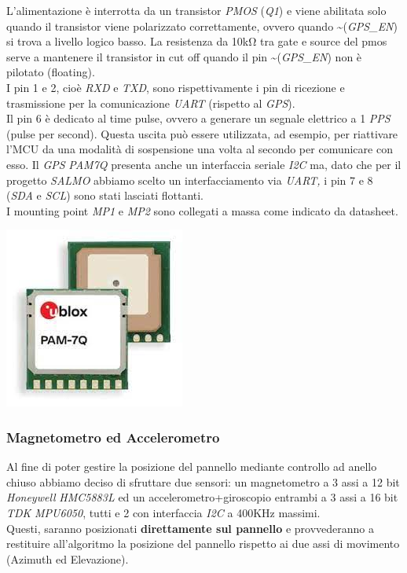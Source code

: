 L'alimentazione è interrotta da un transistor \emph{PMOS} (\emph{Q1}) e
viene abilitata solo quando il transistor viene polarizzato
correttamente, ovvero quando \textasciitilde(\emph{GPS\_EN}) si trova a
livello logico basso. La resistenza da 10kΩ tra gate e source del pmos
serve a mantenere il transistor in cut off quando il pin
\textasciitilde(\emph{GPS\_EN}) non è pilotato (floating).\\
I pin 1 e 2, cioè \emph{RXD} e \emph{TXD}, sono rispettivamente i pin di
ricezione e trasmissione per la comunicazione \emph{UART} (rispetto al
\emph{GPS}).\\
Il pin 6 è dedicato al time pulse, ovvero a generare un segnale
elettrico a 1 \emph{PPS} (pulse per second). Questa uscita può essere
utilizzata, ad esempio, per riattivare l'MCU da una modalità di
sospensione una volta al secondo per comunicare con esso. Il \emph{GPS}
\emph{PAM7Q} presenta anche un interfaccia seriale \emph{I2C} ma, dato
che per il progetto \emph{SALMO} abbiamo scelto un interfacciamento via
\emph{UART,} i pin 7 e 8 (\emph{SDA} e \emph{SCL}) sono stati lasciati
flottanti.\\
I mounting point \emph{MP1} e \emph{MP2} sono collegati a massa come
indicato da datasheet.

\begin{center}
\includegraphics[scale=0.8]{figures/image30.jpg}
\captionsetup{type=figure}
\end{center}

\hypertarget{magnetometro-ed-accelerometro}{%
\subsubsection{\texorpdfstring{\hfill\break
Magnetometro ed Accelerometro\\
}{ Magnetometro ed Accelerometro }}\label{magnetometro-ed-accelerometro}}

Al fine di poter gestire la posizione del pannello mediante controllo ad
anello chiuso abbiamo deciso di sfruttare due sensori: un magnetometro a
3 assi a 12 bit \emph{Honeywell} \emph{HMC5883L} ed un
accelerometro+giroscopio entrambi a 3 assi a 16 bit \emph{TDK}
\emph{MPU6050}, tutti e 2 con interfaccia \emph{I2C} a 400KHz massimi.\\
Questi, saranno posizionati \textbf{direttamente sul pannello} e
provvederanno a restituire all'algoritmo la posizione del pannello
rispetto ai due assi di movimento (Azimuth ed Elevazione).

